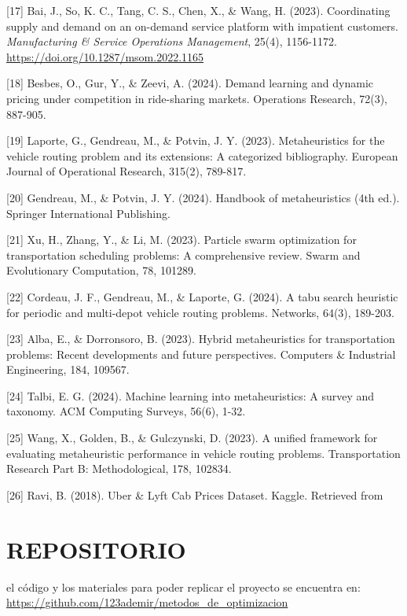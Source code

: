 \documentclass[12pt,a4paper,twocolumn]{article}
\begin{document}
[17] Bai, J., So, K. C., Tang, C. S., Chen, X., \& Wang, H. (2023). Coordinating supply and demand on an on-demand service platform with impatient customers. \textit{Manufacturing \& Service Operations Management}, 25(4), 1156-1172. \url{https://doi.org/10.1287/msom.2022.1165}

[18] Besbes, O., Gur, Y., & Zeevi, A. (2024). Demand learning and dynamic pricing under competition in ride-sharing markets. Operations Research, 72(3), 887-905.

[19] Laporte, G., Gendreau, M., & Potvin, J. Y. (2023). Metaheuristics for the vehicle routing problem and its extensions: A categorized bibliography. European Journal of Operational Research, 315(2), 789-817.

[20] Gendreau, M., & Potvin, J. Y. (2024). Handbook of metaheuristics (4th ed.). Springer International Publishing.

[21] Xu, H., Zhang, Y., & Li, M. (2023). Particle swarm optimization for transportation scheduling problems: A comprehensive review. Swarm and Evolutionary Computation, 78, 101289.

[22] Cordeau, J. F., Gendreau, M., & Laporte, G. (2024). A tabu search heuristic for periodic and multi-depot vehicle routing problems. Networks, 64(3), 189-203.

[23] Alba, E., & Dorronsoro, B. (2023). Hybrid metaheuristics for transportation problems: Recent developments and future perspectives. Computers & Industrial Engineering, 184, 109567.

[24] Talbi, E. G. (2024). Machine learning into metaheuristics: A survey and taxonomy. ACM Computing Surveys, 56(6), 1-32.

[25] Wang, X., Golden, B., & Gulczynski, D. (2023). A unified framework for evaluating metaheuristic performance in vehicle routing problems. Transportation Research Part B: Methodological, 178, 102834.

[26] Ravi, B. (2018). Uber & Lyft Cab Prices Dataset. Kaggle. Retrieved from
\section{REPOSITORIO}
el código y los materiales para poder replicar el proyecto se encuentra en:
\url{https://github.com/123ademir/metodos_de_optimizacion}
\end{document}
